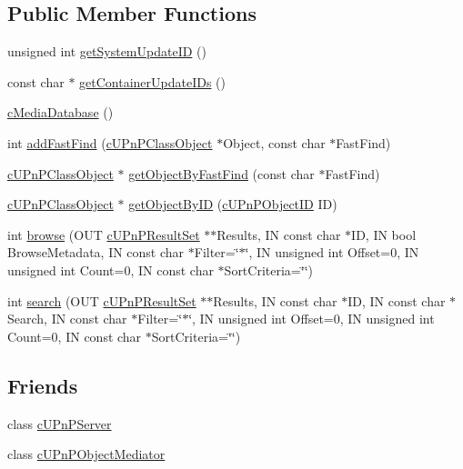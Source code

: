\subsection*{Public Member Functions}
\begin{CompactItemize}
\item 
unsigned int \hyperlink{classcMediaDatabase_96232caa30b80d4e3ca667c317101fd0}{getSystemUpdateID} ()
\item 
const char $\ast$ \hyperlink{classcMediaDatabase_dadd330e273e0f354d51b76cee436198}{getContainerUpdateIDs} ()
\item 
\hyperlink{classcMediaDatabase_ace0720fbddbdd7f2e4ca5ad16d5acd2}{cMediaDatabase} ()
\item 
int \hyperlink{classcMediaDatabase_1aec38e63143c7eb26012f1c74fe373d}{addFastFind} (\hyperlink{classcUPnPClassObject}{cUPnPClassObject} $\ast$Object, const char $\ast$FastFind)
\item 
\hyperlink{classcUPnPClassObject}{cUPnPClassObject} $\ast$ \hyperlink{classcMediaDatabase_b0fac893d82c29276d68b94569cfef1d}{getObjectByFastFind} (const char $\ast$FastFind)
\item 
\hyperlink{classcUPnPClassObject}{cUPnPClassObject} $\ast$ \hyperlink{classcMediaDatabase_b8da7da9612c64de0ddf88db3c316d5a}{getObjectByID} (\hyperlink{structcUPnPObjectID}{cUPnPObjectID} ID)
\item 
int \hyperlink{classcMediaDatabase_25ff666113dbe72598e4ef4e23af5d8f}{browse} (OUT \hyperlink{structcUPnPResultSet}{cUPnPResultSet} $\ast$$\ast$Results, IN const char $\ast$ID, IN bool BrowseMetadata, IN const char $\ast$Filter=\char`\"{}$\ast$\char`\"{}, IN unsigned int Offset=0, IN unsigned int Count=0, IN const char $\ast$SortCriteria=\char`\"{}\char`\"{})
\item 
int \hyperlink{classcMediaDatabase_36bdc240d3fa11d685440d365d9ab8c9}{search} (OUT \hyperlink{structcUPnPResultSet}{cUPnPResultSet} $\ast$$\ast$Results, IN const char $\ast$ID, IN const char $\ast$Search, IN const char $\ast$Filter=\char`\"{}$\ast$\char`\"{}, IN unsigned int Offset=0, IN unsigned int Count=0, IN const char $\ast$SortCriteria=\char`\"{}\char`\"{})
\end{CompactItemize}
\subsection*{Friends}
\begin{CompactItemize}
\item 
\hypertarget{classcMediaDatabase_02ebb94fd2cdff4bfb2da3267446d62b}{
class \hyperlink{classcMediaDatabase_02ebb94fd2cdff4bfb2da3267446d62b}{cUPnPServer}}
\label{classcMediaDatabase_02ebb94fd2cdff4bfb2da3267446d62b}

\item 
\hypertarget{classcMediaDatabase_aefab39434a832c545ac75a79fa81d23}{
class \hyperlink{classcMediaDatabase_aefab39434a832c545ac75a79fa81d23}{cUPnPObjectMediator}}
\label{classcMediaDatabase_aefab39434a832c545ac75a79fa81d23}

\end{CompactItemize}


